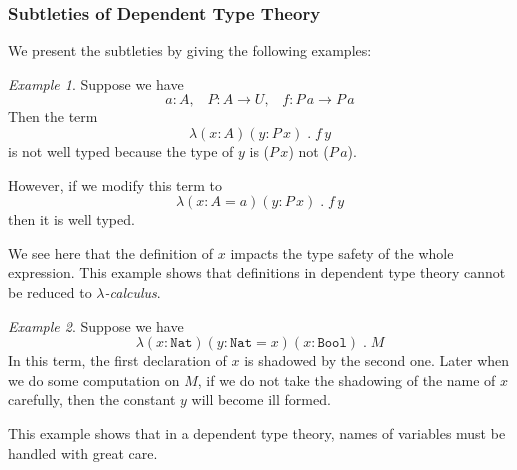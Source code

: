 \documentclass{article}
\theoremstyle{remark}
\newtheorem{example}{Example}
\begin{document}
\subsubsection{Subtleties of Dependent Type Theory} \label{subsubsec:subtleties}
We present the subtleties by giving the following examples: 

\begin{example}\label{exa1}
  Suppose we have
  \[ a : A, \;\;\; P : A \to U, \;\;\; f : P \, a \to P \, a \]
  Then the term
  \[ \lambda (x : A) (y : P \, x) \; . \; f \, y \]
  is not well typed because the type of $y$ is ($P \, x$) not ($P \, a$).

  However, if we modify this term to
  \[ \lambda (x : A = a) (y : P \, x) \; . \; f \, y \]
  then it is well typed.

  We see here that the definition of $x$ impacts the type safety of the whole expression. This example shows that definitions in dependent type theory cannot be reduced to \emph{$\lambda$-calculus}.
\end{example}

\begin{example}\label{exa2}
  Suppose we have
  \[ \lambda (x : \texttt{Nat}) (y : \texttt{Nat} = x) (x : \texttt{Bool}) \; . \; M \]
  In this term, the first declaration of $x$ is shadowed by the second one. Later when we do some computation on $M$, if we do not take the shadowing of the name of $x$ carefully, then the constant $y$ will become ill formed.

  This example shows that in a dependent type theory, names of variables must be handled with great care.
\end{example}
\end{document}
